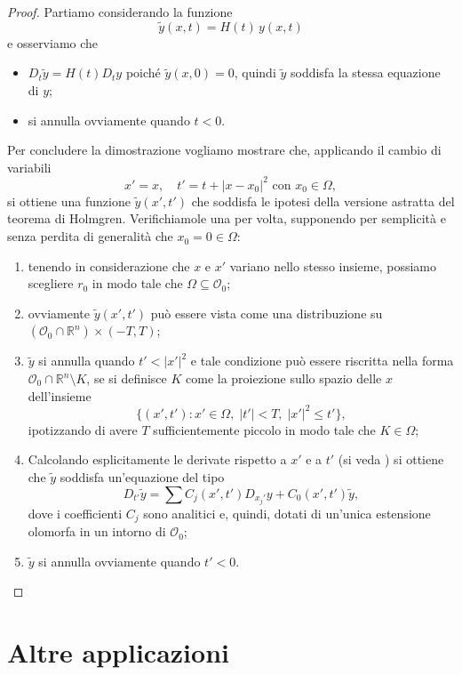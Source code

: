 \begin{proof}
Partiamo considerando la funzione $$\widetilde{y}(x,t) = H(t) \, y(x,t)$$
e osserviamo che
\begin{itemize}
\item $D_t \widetilde{y} = H(t) D_t y$ poiché $\widetilde{y}(x,0)=0$, quindi $\widetilde{y}$ soddisfa la stessa equazione di $y$;
\item si annulla ovviamente quando $t<0$.
\end{itemize}
Per concludere la dimostrazione vogliamo mostrare che, applicando il cambio di variabili 
$$x'=x, \quad t'=t+|x-x_0|^2 \text{ con } x_0\in \Omega ,$$
si ottiene una funzione $\widetilde{y}(x',t')$ che soddisfa le ipotesi della versione astratta del teorema di Holmgren. Verifichiamole una per volta, supponendo per semplicità e senza perdita di generalità che $x_0=0\in\Omega$:
\begin{enumerate}
\item tenendo in considerazione che $x$ e $x'$ variano nello stesso insieme, possiamo scegliere $r_0$ in modo tale che $\Omega \subseteq \mathcal{O}_0$;
\item ovviamente $\widetilde{y}(x',t')$ può essere vista come una distribuzione su ${(\mathcal{O}_0 \cap \mathbb{R}^n) \times (-T,T)}$;
\item $\widetilde{y}$ si annulla quando $t'<|x'|^2$ e tale condizione può essere riscritta nella forma ${\mathcal{O}_0 \cap \mathbb{R}^n \setminus K}$, se si definisce $K$ come la proiezione sullo spazio delle $x$ dell'insieme
$$\{(x',t'): x'\in\Omega,\; |t'|<T,\; |x'|^2\leq t' \},$$
ipotizzando di avere $T$ sufficientemente piccolo in modo tale che $K\in\Omega$;
\item Calcolando esplicitamente le derivate rispetto a $x'$ e a $t'$ (si veda \cite[cap.21]{Treves}) si ottiene che $\widetilde{y}$ soddisfa un'equazione del tipo
$$D_{t'} \widetilde{y} = \sum C_j (x',t') D_{x_j'}y+C_0(x',t')\widetilde{y},$$ 
dove i coefficienti $C_j$ sono analitici e, quindi, dotati di un'unica estensione olomorfa in un intorno di $\mathcal{O}_0$;
\item $\widetilde{y}$ si annulla ovviamente quando $t'<0$.
\end{enumerate}
\end{proof}




\newpage
\section{Altre applicazioni}

